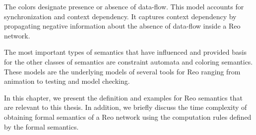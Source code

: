 \begin{itemize}
 The colors designate presence or absence of data-flow. This model accounts for synchronization and context dependency. It captures context dependency by propagating negative information about the absence of data-flow inside a Reo network. %
 
 \end{itemize}
%

\noindent
The most important types of semantics that have influenced and provided basis for the other classes of semantics  are constraint automata and coloring semantics. These models are the underlying models of  several tools for Reo ranging from animation to testing and model checking.

 In this chapter, we present the definition and examples for Reo semantics that are relevant to this thesis. In addition, we briefly discuss the time complexity of obtaining formal semantics of a Reo network using the computation rules defined by the formal semantics.
 
